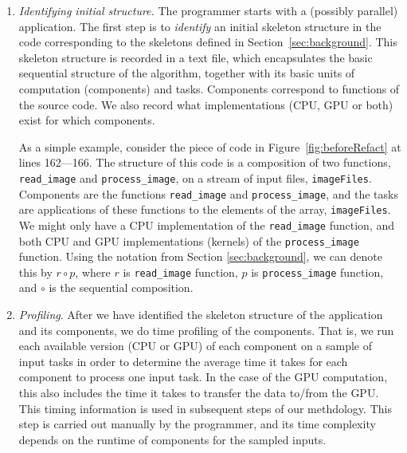 \documentclass[smallextended]{svjour3}
\begin{document}
\begin{enumerate}
\item \emph{Identifying initial structure.} The programmer starts with a (possibly parallel) application. The first step is to \emph{identify}
 an initial
  skeleton structure in the code corresponding to the skeletons defined in Section~\ref{sec:background}.
  This skeleton structure is recorded in a text file, which encapsulates the basic sequential structure of the
  algorithm, together with its basic units of computation (components) and
  tasks. Components correspond to functions of the source code. 
  We also record what implementations (CPU, GPU or both) exist
  for which components. 

  As a simple example, consider the piece of code in Figure~\ref{fig:beforeRefact} at lines 162---166.
  The structure of this code is a composition of two functions,
  \lstinline|read_image| and \lstinline|process_image|, on a stream of
  input files, \lstinline|imageFiles|. Components are the
  functions \lstinline|read_image| and \lstinline|process_image|, and the
  tasks are applications of these functions to the elements of the array,
  \lstinline|imageFiles|. We might only have a CPU implementation of
  the \lstinline|read_image| function, and both CPU and GPU implementations (kernels)
  of the \lstinline|process_image| function.
  Using the notation from Section
  \ref{sec:background}, we can denote this by $r \circ p$, where $r$ is 
  \lstinline{read_image} function, $p$ is
  \lstinline|process_image| function, and $\circ$ is the sequential
  composition. 


\item \emph{Profiling}. After we have identified the skeleton
  structure of the application and its components, we do time
  profiling of the components. That is, we run each available version (CPU or
  GPU) of each component on a sample of input tasks in order to determine
  the average time it takes for each component to process one input
  task. In the case of the GPU computation, this also includes the
  time it takes to transfer the data to/from the GPU.
  This timing information is used in subsequent  steps of our
  methdology. This step is carried out manually by the programmer, and
  its time complexity depends on the runtime of components for the
  sampled inputs.


\end{enumerate}
\end{document}
